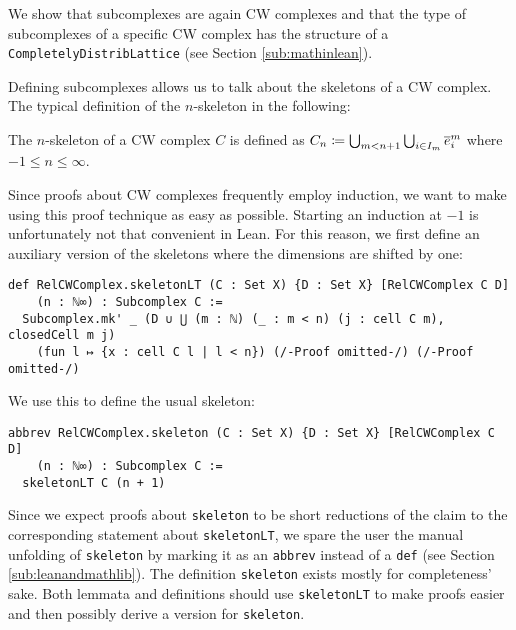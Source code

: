 We show that subcomplexes are again CW complexes and that the type of subcomplexes of a specific CW complex has the structure of a \lstinline|CompletelyDistribLattice| (see Section  \ref{sub:mathinlean}).  

Defining subcomplexes allows us to talk about the skeletons of a CW complex. 
The typical definition of the $n$-skeleton in the following: 

\begin{defi}
  The $n$-skeleton of a CW complex $C$ is defined as $C_n \coloneq \bigcup_{m < n + 1} \bigcup_{i \in I_m} \closedCell{m}{i}$ where $-1 \le n \le \infty$.
\end{defi}

Since proofs about CW complexes frequently employ induction, we want to make using this proof technique as easy as possible. 
Starting an induction at $-1$ is unfortunately not that convenient in Lean. 
For this reason, we first define an auxiliary version of the skeletons where the dimensions are shifted by one: 

\begin{lstlisting}[frame=single]
def RelCWComplex.skeletonLT (C : Set X) {D : Set X} [RelCWComplex C D] 
    (n : ℕ∞) : Subcomplex C :=
  Subcomplex.mk' _ (D ∪ ⋃ (m : ℕ) (_ : m < n) (j : cell C m), closedCell m j)
    (fun l ↦ {x : cell C l | l < n}) (/-Proof omitted-/) (/-Proof omitted-/)
\end{lstlisting}

We use this to define the usual skeleton: 

\begin{lstlisting}[frame=single]
abbrev RelCWComplex.skeleton (C : Set X) {D : Set X} [RelCWComplex C D] 
    (n : ℕ∞) : Subcomplex C :=
  skeletonLT C (n + 1)
\end{lstlisting}

Since we expect proofs about \lstinline|skeleton| to be short reductions of the claim to the corresponding statement about \lstinline|skeletonLT|, we spare the user the manual unfolding of \lstinline|skeleton| by marking it as an \lstinline|abbrev| instead of a \lstinline|def| (see Section \ref{sub:leanandmathlib}).
The definition \lstinline|skeleton| exists mostly for completeness' sake. 
Both lemmata and definitions should use \lstinline|skeletonLT| to make proofs easier and then possibly derive a version for \lstinline|skeleton|.


